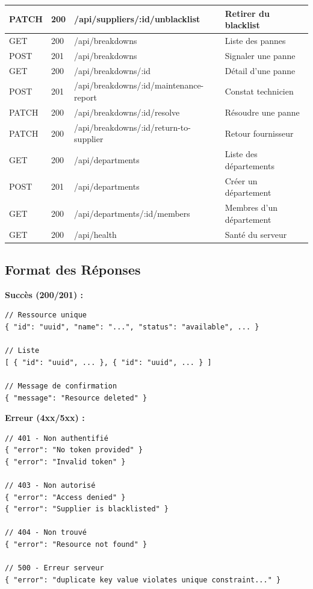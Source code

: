 \documentclass[12pt,a4paper]{report}
\begin{document}
\begin{longtable}{|L{2.5cm}|L{2cm}|L{4cm}|L{5cm}|}
\hline
PATCH & 200 & /api/suppliers/:id/unblacklist & Retirer du blacklist \\
\hline
GET & 200 & /api/breakdowns & Liste des pannes \\
\hline
POST & 201 & /api/breakdowns & Signaler une panne \\
\hline
GET & 200 & /api/breakdowns/:id & Détail d'une panne \\
\hline
POST & 201 & /api/breakdowns/:id/maintenance-report & Constat technicien \\
\hline
PATCH & 200 & /api/breakdowns/:id/resolve & Résoudre une panne \\
\hline
PATCH & 200 & /api/breakdowns/:id/return-to-supplier & Retour fournisseur \\
\hline
GET & 200 & /api/departments & Liste des départements \\
\hline
POST & 201 & /api/departments & Créer un département \\
\hline
GET & 200 & /api/departments/:id/members & Membres d'un département \\
\hline
GET & 200 & /api/health & Santé du serveur \\
\hline
\end{longtable}

\subsection{Format des Réponses}

\textbf{Succès (200/201) :}
\begin{lstlisting}[style=js, caption={Format réponse succès}]
// Ressource unique
{ "id": "uuid", "name": "...", "status": "available", ... }

// Liste
[ { "id": "uuid", ... }, { "id": "uuid", ... } ]

// Message de confirmation
{ "message": "Resource deleted" }
\end{lstlisting}

\textbf{Erreur (4xx/5xx) :}
\begin{lstlisting}[style=js, caption={Format réponse erreur}]
// 401 - Non authentifié
{ "error": "No token provided" }
{ "error": "Invalid token" }

// 403 - Non autorisé
{ "error": "Access denied" }
{ "error": "Supplier is blacklisted" }

// 404 - Non trouvé
{ "error": "Resource not found" }

// 500 - Erreur serveur
{ "error": "duplicate key value violates unique constraint..." }
\end{lstlisting}
\end{document}
